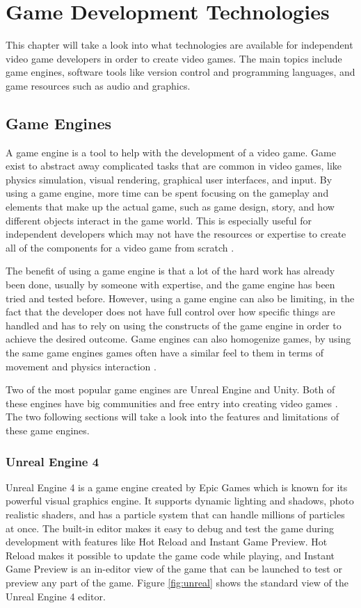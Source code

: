 \chapter{Game Development Technologies}
\label{chp:technology}
This chapter will take a look into what technologies are available for independent video game developers in order to create video games. The main topics include game engines, software tools like version control and programming languages, and game resources such as audio and graphics.


\section{Game Engines}
A game engine is a tool to help with the development of a video game. Game exist to abstract away complicated tasks that are common in video games, like physics simulation, visual rendering, graphical user interfaces, and input. By using a game engine, more time can be spent focusing on the gameplay and elements that make up the actual game, such as game design, story, and how different objects interact in the game world. This is especially useful for independent developers which may not have the resources or expertise to create all of the components for a video game from scratch \cite{ward2008engine}.

The benefit of using a game engine is that a lot of the hard work has already been done, usually by someone with expertise, and the game engine has been tried and tested before. However, using a game engine can also be limiting, in the fact that the developer does not have full control over how specific things are handled and has to rely on using the constructs of the game engine in order to achieve the desired outcome. Game engines can also homogenize games, by using the same game engines games often have a similar feel to them in terms of movement and physics interaction \cite{enger2013engine}.

Two of the most popular game engines are Unreal Engine and Unity. Both of these engines have big communities and free entry into creating video games \cite{malik2016engine}. The two following sections will take a look into the features and limitations of these game engines.

\subsection{Unreal Engine 4}
Unreal Engine 4 is a game engine created by Epic Games which is known for its powerful visual graphics engine. It supports dynamic lighting and shadows, photo realistic shaders, and has a particle system that can handle millions of particles at once. The built-in editor makes it easy to debug and test the game during development with features like Hot Reload and Instant Game Preview. Hot Reload makes it possible to update the game code while playing, and Instant Game Preview is an in-editor view of the game that can be launched to test or preview any part of the game. Figure \ref{fig:unreal} shows the standard view of the Unreal Engine 4 editor.

